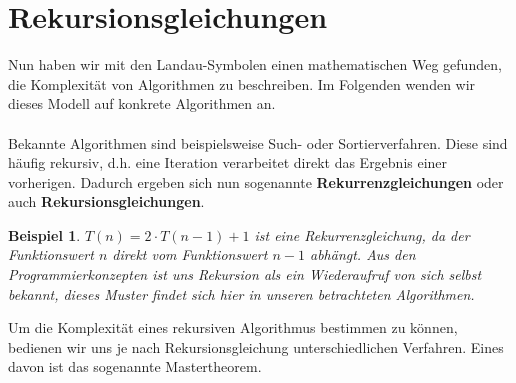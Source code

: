 \documentclass[11pt,a4paper]{scrartcl}
\newtheorem{example}{Beispiel}
\begin{document}
\section{Rekursionsgleichungen}
Nun haben wir mit den Landau-Symbolen einen mathematischen Weg gefunden, die Komplexität von Algorithmen zu beschreiben. Im Folgenden wenden wir dieses Modell auf konkrete Algorithmen an. \\\\
Bekannte Algorithmen sind beispielsweise Such- oder Sortierverfahren. Diese sind häufig rekursiv, d.h. eine Iteration verarbeitet direkt das Ergebnis einer vorherigen. Dadurch ergeben sich nun sogenannte \textbf{Rekurrenzgleichungen} oder auch \textbf{Rekursionsgleichungen}.
\begin{example}
$T(n) = 2 \cdot T(n-1) + 1$ ist eine Rekurrenzgleichung, da der Funktionswert $n$ direkt vom Funktionswert $n-1$ abhängt. Aus den Programmierkonzepten ist uns Rekursion als ein {\glqq}Wiederaufruf von sich selbst{\grqq} bekannt, dieses Muster findet sich hier in unseren betrachteten Algorithmen.
\end{example}
Um die Komplexität eines rekursiven Algorithmus bestimmen zu können, bedienen wir uns je nach Rekursionsgleichung unterschiedlichen Verfahren. Eines davon ist das sogenannte Mastertheorem. 
\end{document}
